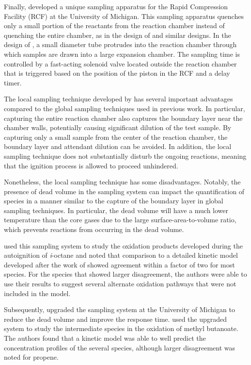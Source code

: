 \documentclass[../main.tex]{subfiles}
\begin{document}
Finally, \textcite{He2005a} developed a unique sampling apparatus for the
Rapid Compression Facility (RCF) at the University of Michigan. This
sampling apparatus quenches only a small portion of the reactants from
the reaction chamber instead of quenching the entire chamber, as in the
design of \textcite{Roblee1961} and similar designs. In the design of
\textcite{He2005a}, a small diameter tube protrudes into the reaction
chamber through which samples are drawn into a large expansion chamber.
The sampling time is controlled by a fast-acting solenoid valve located
outside the reaction chamber that is triggered based on the position of
the piston in the RCF and a delay timer.

The local sampling technique developed by \textcite{He2005a} has several
important advantages compared to the global sampling techniques used
in previous work. In particular, capturing the entire reaction chamber
also captures the boundary layer near the chamber walls, potentially
causing significant dilution of the test sample. By capturing only a
small sample from the center of the reaction chamber, the boundary layer
and attendant dilution can be avoided. In addition, the local sampling
technique does not substantially disturb the ongoing reactions,
meaning that the ignition process is allowed to proceed unhindered.

Nonetheless, the local sampling technique has some disadvantages.
Notably, the presence of dead volume in the sampling system can impact
the quantification of species in a manner similar to the capture of the
boundary layer in global sampling techniques. In particular, the dead
volume will have a much lower temperature than the core gases due to the
large surface-area-to-volume ratio, which prevents reactions from
occurring in the dead volume.

\textcite{He2007} used this sampling system to study the oxidation
products developed during the autoignition of \textit{i}-octane and noted
that comparison to a detailed kinetic model developed after the work of
\textcite{Minetti1996} showed agreement within a factor of two for most
species. For the species that showed larger disagreement, the authors
were able to use their results to suggest several alternate oxidation
pathways that were not included in the model.

Subsequently, \textcite{Walton2008} upgraded the sampling system at the
University of Michigan to reduce the dead volume and improve the
response time. \textcite{Walton2011} used the upgraded system to study
the intermediate species in the oxidation of methyl butanoate. The
authors found that a kinetic model was able to well predict the concentration
profiles of the several species, although larger disagreement was noted
for propene.
\end{document}
